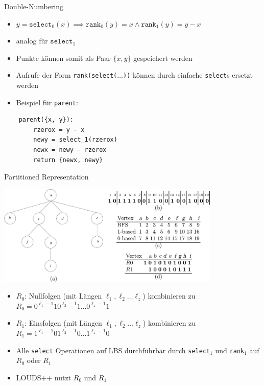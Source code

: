 \documentclass[ngerman,aspectratio=169,10pt]{beamer}
\begin{document}
\begin{frame}[fragile]{Double-Numbering}
    \begin{itemize}
        \item $y=\texttt{select}_0(x)\implies \texttt{rank}_0(y)=x\wedge \texttt{rank}_1(y)=y-x$
        \item analog für $\texttt{select}_1$
        \item Punkte können somit als Paar $\{x, y\}$ gespeichert werden
        \item Aufrufe der Form \texttt{rank(select($\dots$))} können durch einfache \texttt{select}s ersetzt werden
        \item Beispiel für \texttt{parent}:
    \end{itemize}
	\begin{lstlisting}
	parent({x, y}):
		rzerox = y - x
		newy = select_1(rzerox)
		newx = newy - rzerox
		return {newx, newy}
	\end{lstlisting}
\end{frame}

\begin{frame}{Partitioned Representation}
    \begin{center}
        \includegraphics[width=0.8\textwidth]{LOUDS.jpg}
    \end{center}
    \begin{itemize}
        \item $R_0$: Nullfolgen (mit Längen $\ell_1,\ell_2\ldots\ell_z$) kombinieren zu $R_0=0^{\ell_1-1}10^{\ell_2-1}1\ldots0^{\ell_z-1}1$
        \item  $R_1$: Einsfolgen (mit Längen $\ell_1,\ell_2\ldots\ell_z$) kombinieren zu $R_1=1^{\ell_1-1}01^{\ell_2-1}0\ldots1^{\ell_z-1}0$
        \item Alle \texttt{select} Operationen auf LBS durchführbar durch \texttt{select}$_1$ und \texttt{rank}$_1$ auf $R_0$ oder $R_1$
        \item LOUDS++ nutzt $R_0$ und $R_1$
    \end{itemize}
\end{frame}
\end{document}
